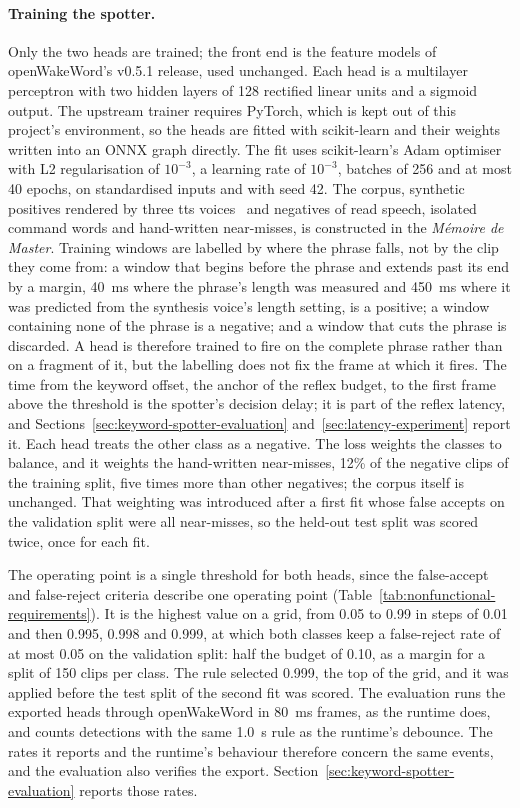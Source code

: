 \paragraph{Training the spotter.} Only the two heads are trained; the front end is the feature
models of openWakeWord's v0.5.1 release, used unchanged. Each head is a multilayer perceptron with
two hidden layers of 128 rectified linear units and a sigmoid output. The upstream trainer requires
PyTorch, which is kept out of this project's environment, so the heads are fitted with scikit-learn
and their weights written into an ONNX graph directly. The fit uses scikit-learn's Adam optimiser
with L2 regularisation of $10^{-3}$, a learning rate of $10^{-3}$, batches of 256 and at most 40
epochs, on standardised inputs and with seed 42. The corpus, synthetic positives rendered by three
\gls{tts} voices~\cite{piper} and negatives of read speech, isolated command words and hand-written
near-misses, is constructed in the \emph{M\'emoire de Master}. Training windows are labelled by
where the phrase falls, not by the clip they come from: a window that begins before the phrase and
extends past its end by a margin, 40~ms where the phrase's length was measured and 450~ms where it
was predicted from the synthesis voice's length setting, is a positive; a window containing none of
the phrase is a negative; and a window that cuts the phrase is discarded. A head is therefore
trained to fire on the complete phrase rather than on a fragment of it, but the labelling does not
fix the frame at which it fires. The time from the keyword offset, the anchor of the reflex budget,
to the first frame above the threshold is the spotter's decision delay; it is part of the reflex
latency, and Sections~\ref{sec:keyword-spotter-evaluation} and~\ref{sec:latency-experiment} report
it. Each head treats the other class as a negative. The loss weights the classes to balance, and it
weights the hand-written near-misses, 12\% of the negative clips of the training split, five times
more than other negatives; the corpus itself is unchanged. That
weighting was introduced after a first fit whose false accepts on the validation split were all
near-misses, so the held-out test split was scored twice, once for each fit.

The operating point is a single threshold for both heads, since the false-accept and false-reject
criteria describe one operating point (Table~\ref{tab:nonfunctional-requirements}). It is the
highest value on a grid, from 0.05 to 0.99 in steps of 0.01 and then 0.995, 0.998 and 0.999, at
which both classes keep a false-reject rate of at most 0.05 on the validation split: half the
budget of 0.10, as a margin for a split of 150 clips per class. The rule selected 0.999, the top of
the grid, and it was applied before the test split of the second fit was scored. The evaluation runs
the exported heads through openWakeWord in 80~ms frames, as the runtime does, and counts detections
with the same 1.0~s rule as the runtime's debounce. The rates it reports and the runtime's
behaviour therefore concern the same events, and the evaluation also verifies the export.
Section~\ref{sec:keyword-spotter-evaluation} reports those rates.


